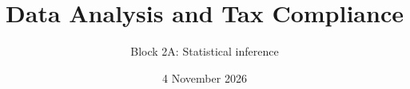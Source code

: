 \documentclass[11pt,aspectratio=169]{beamer}
\title{Data Analysis and Tax Compliance}
\subtitle{Block 2A: Statistical inference}
\date{4 November 2026}
\begin{document}
\begin{frame}\titlepage\end{frame}

\end{document}
